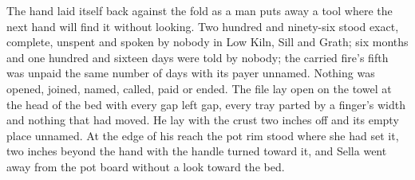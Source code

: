 The hand laid itself back against the fold as a man puts away a tool where the next hand will find it without looking. Two hundred and ninety-six stood exact, complete, unspent and spoken by nobody in Low Kiln, Sill and Grath; six months and one hundred and sixteen days were told by nobody; the carried fire's fifth was unpaid the same number of days with its payer unnamed. Nothing was opened, joined, named, called, paid or ended. The file lay open on the towel at the head of the bed with every gap left gap, every tray parted by a finger's width and nothing that had moved. He lay with the crust two inches off and its empty place unnamed. At the edge of his reach the pot rim stood where she had set it, two inches beyond the hand with the handle turned toward it, and Sella went away from the pot board without a look toward the bed.
